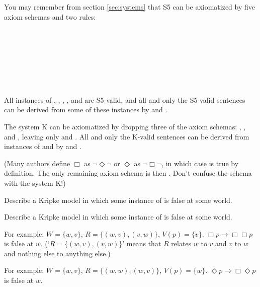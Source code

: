 You may remember from section \ref{sec:systems} that S5 can be axiomatized by
five axiom schemas and two rules:
%
\begin{principles}
  \\
  \\
  \\
  \\
  \\
  \\
\end{principles}
%
All instances of , , , , and  are S5-valid, and
all and only the S5-valid sentences can be derived from some of these instances
by  and .

The system K can be axiomatized by dropping three of the axiom schemas: ,
, and , leaving only  and . All and only the K-valid
sentences can be derived from instances of  and  by 
and .

(Many authors define $\Box$ as $\neg\Diamond\neg$ or $\Diamond$ as
$\neg\Box\neg$, in which case  is true by definition. The only
remaining axiom schema is then . Don't confuse the schema  with the
system K!)

\begin{exercise}
  \begin{exlist}
    \item Describe a Kripke model in which some instance of  is false at
    some world.
    \item Describe a Kripke model in which some instance of  is false at
    some world.
  \end{exlist}
\end{exercise}
\begin{solution}
  \begin{sollist}
    \item For example: $W = \{ w,v \}$, $R = \{ (w,v), (v,w) \}$,
    $V(p) = \{ v \}$. $\Box p \to \Box\Box p$ is false at $w$.
    (`$R = \{ (w,v), (v,w) \}$' means that $R$ relates $w$ to $v$ and $v$ to $w$
    and nothing else to anything else.)
    \item For example: $W = \{ w,v \}$, $R = \{ (w,w), (w,v) \}$,
    $V(p) = \{ w \}$. $\Diamond p \to \Box\Diamond p$ is false at $w$.
  \end{sollist}
\end{solution}

